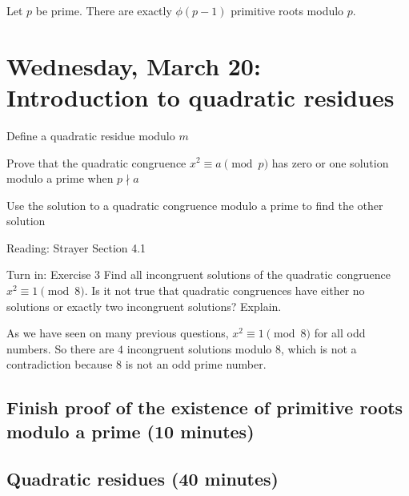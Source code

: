 \documentclass[letterpaper, 11 pt]{ximera}
\begin{document}
\begin{cor*}[Corollary 5.10]\label{cor:number-prime-roots}
    Let $p$ be prime. There are exactly $\phi(p-1)$ primitive roots modulo $p.$
\end{cor*}


\section{Wednesday, March 20: Introduction to quadratic residues}

\begin{obj}
    \item Define a quadratic residue modulo $m$
    \item Prove that the quadratic congruence $x^2\equiv a\pmod{p}$ has zero or one solution modulo a prime when $p\nmid a$
    \item Use the solution to a quadratic congruence modulo a prime to find the other solution
\end{obj}


\begin{pre}
    \item[Reading:] Strayer Section 4.1
    \item[Turn in:] Exercise 3
     Find all incongruent solutions of the quadratic congruence $x^2\equiv 1\pmod{8}.$ Is it not true that quadratic congruences have either no solutions or exactly two incongruent solutions? Explain.

     \begin{solution}
        As we have seen on many previous questions, $x^2\equiv 1\pmod{8}$ for all odd numbers. So there are $4$ incongruent solutions modulo $8$, which is not a contradiction because $8$ is not an odd prime number.
     \end{solution}
\end{pre}

\subsection{Finish proof of the existence of primitive roots modulo a prime (10 minutes)}

\subsection{Quadratic residues (40 minutes)}
\end{document}
